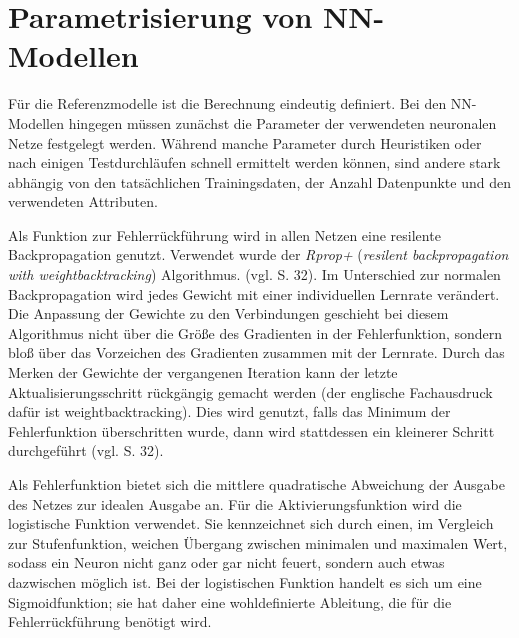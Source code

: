 \documentclass[
	12pt,
	a4paper,
	BCOR10mm,
	DIV14,
	listof=totoc,
	bibliography=totoc,
	headsepline
]{scrreprt}
\begin{document}
\begin{table}
	\centering
	\scriptsize
	\label{tab:zusammenfasssung_nn}
	\caption{Kurzbeschreibungen der der NN-Modelle. Diese basieren auf neuronalen Netzen und bilden den Eingabevektor auf die Laufzeit ab.}
\end{table}

\section{Parametrisierung von NN-Modellen}
\label{parametrisierung}
Für die Referenzmodelle ist die Berechnung eindeutig definiert.
Bei den NN-Modellen hingegen müssen zunächst die Parameter der verwendeten neuronalen Netze festgelegt werden. 
Während manche Parameter durch Heuristiken oder nach einigen Testdurchläufen schnell ermittelt werden können, sind andere stark abhängig von den tatsächlichen Trainingsdaten, der Anzahl Datenpunkte und den verwendeten Attributen. 

Als Funktion zur Fehlerrückführung wird in allen Netzen eine resilente Backpropagation genutzt. Verwendet wurde der \textit{Rprop+} (\textit{resilent backpropagation with weightbacktracking}) Algorithmus.  (vgl. \cite{gunther2010neuralnet} S. 32).
Im Unterschied zur normalen Backpropagation wird jedes Gewicht mit einer individuellen Lernrate verändert. Die Anpassung der Gewichte zu den Verbindungen geschieht bei diesem Algorithmus nicht über die Größe des Gradienten in der Fehlerfunktion, sondern bloß über das Vorzeichen des Gradienten zusammen mit der Lernrate.
Durch das Merken der Gewichte der vergangenen Iteration kann der letzte Aktualisierungsschritt rückgängig gemacht werden (der englische Fachausdruck dafür ist weightbacktracking). Dies wird genutzt, falls das Minimum der Fehlerfunktion überschritten wurde, dann wird stattdessen ein kleinerer Schritt durchgeführt (vgl. \cite{gunther2010neuralnet} S. 32).

Als Fehlerfunktion bietet sich die mittlere quadratische Abweichung der Ausgabe des Netzes zur idealen Ausgabe an.
Für die Aktivierungsfunktion wird die logistische Funktion verwendet. Sie kennzeichnet sich durch einen, im Vergleich zur Stufenfunktion, weichen Übergang zwischen minimalen und maximalen Wert, sodass ein Neuron nicht ganz oder gar nicht feuert, sondern auch etwas dazwischen möglich ist. Bei der logistischen Funktion handelt es sich um eine Sigmoidfunktion; sie hat daher eine wohldefinierte Ableitung, die für die Fehlerrückführung benötigt wird. 
\end{document}
